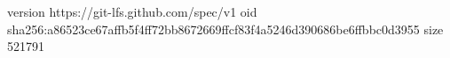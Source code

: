 version https://git-lfs.github.com/spec/v1
oid sha256:a86523ce67affb5f4ff72bb8672669ffcf83f4a5246d390686be6ffbbc0d3955
size 521791

